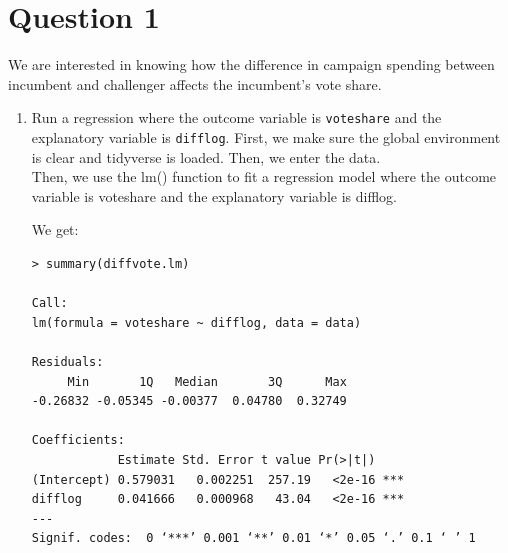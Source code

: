 \documentclass[12pt,letterpaper]{article}
\begin{document}
\section*{Question 1}
\vspace{.25cm}
\noindent We are interested in knowing how the difference in campaign spending between incumbent and challenger affects the incumbent's vote share. 
	\begin{enumerate}
		\item Run a regression where the outcome variable is \texttt{voteshare} and the explanatory variable is \texttt{difflog}.	\vspace{5cm}
\noindent First, we make sure the global environment is clear and tidyverse is loaded. Then, we enter the data.\\
  
\vspace{.5cm}   
\noindent Then, we use the lm() function to fit a regression model where the outcome variable is voteshare and the explanatory variable is difflog.\\
\vspace{.5cm}
  
\vspace{.5cm}    
\noindent We get:\\
\begin{verbatim}
> summary(diffvote.lm)

Call:
lm(formula = voteshare ~ difflog, data = data)

Residuals:
     Min       1Q   Median       3Q      Max 
-0.26832 -0.05345 -0.00377  0.04780  0.32749 

Coefficients:
            Estimate Std. Error t value Pr(>|t|)    
(Intercept) 0.579031   0.002251  257.19   <2e-16 ***
difflog     0.041666   0.000968   43.04   <2e-16 ***
---
Signif. codes:  0 ‘***’ 0.001 ‘**’ 0.01 ‘*’ 0.05 ‘.’ 0.1 ‘ ’ 1


\end{verbatim}
\end{enumerate}
\end{document}
